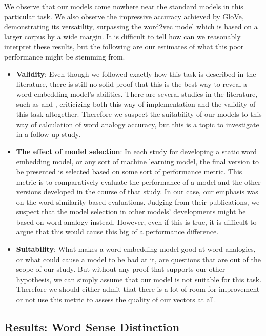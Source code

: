 We observe that our models come nowhere near the standard models in this particular task. We also observe the impressive accuracy achieved by GloVe, demonstrating its versatility, surpassing the word2vec model which is based on a larger corpus by a wide margin. It is difficult to tell how can we reasonably interpret these results, but the following are our estimates of what this poor performance might be stemming from.

\begin{itemize}
    \item \textbf{Validity}: Even though we followed exactly how this task is described in the literature, there is still no solid proof that this is the best way to reveal a word embedding model's abilities. There are several studies in the literature, such as \cite{analogy1} and \cite{analogy2}, criticizing both this way of implementation and the validity of this task altogether. Therefore we suspect the suitability of our models to this way of calculation of word analogy accuracy, but this is a topic to investigate in a follow-up study.
    \item \textbf{The effect of model selection}: In each study for developing a static word embedding model, or any sort of machine learning model, the final version to be presented is selected based on some sort of performance metric. This metric is to comparatively evaluate the performance of a model and the other versions developed in the course of that study. In our case, our emphasis was on the word similarity-based evaluations. Judging from their publications, we suspect that the model selection in other models' developments might be based on word analogy instead. However, even if this is true, it is difficult to argue that this would cause this big of a performance difference. 
    \item \textbf{Suitability}: What makes a word embedding model good at word analogies, or what could cause a model to be bad at it, are questions that are out of the scope of our study. But without any proof that supports our other hypothesis, we can simply assume that our model is not suitable for this task. Therefore we should either admit that there is a lot of room for improvement or not use this metric to assess the quality of our vectors at all.
\end{itemize}

\subsection{Results: Word Sense Distinction}

